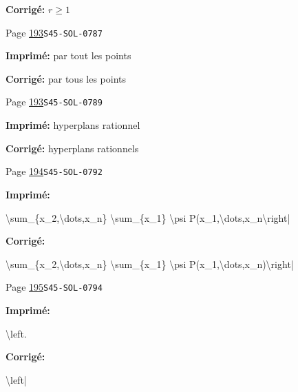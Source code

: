 \begin{description}
\par\noindent\textbf{Corrigé:} $r\geqslant 1$
\smallskip
\item[\hypertarget{apparatus:FR-0169}{169}] Page \hyperlink{printpage:fr:193}{193}\quad\texttt{S45-SOL-0787}
\par\noindent\textbf{Imprimé:} par tout les points
\par\noindent\textbf{Corrigé:} par tous les points
\smallskip
\item[\hypertarget{apparatus:FR-0170}{170}] Page \hyperlink{printpage:fr:193}{193}\quad\texttt{S45-SOL-0789}
\par\noindent\textbf{Imprimé:} hyperplans rationnel
\par\noindent\textbf{Corrigé:} hyperplans rationnels
\smallskip
\item[\hypertarget{apparatus:FR-0171}{171}] Page \hyperlink{printpage:fr:194}{194}\quad\texttt{S45-SOL-0792}
\par\noindent\textbf{Imprimé:} {\footnotesize\ttfamily\raggedright \textbackslash{}\allowbreak{}sum\_\allowbreak{}\{\allowbreak{}x\_\allowbreak{}2,\allowbreak{}\textbackslash{}\allowbreak{}dots,\allowbreak{}x\_\allowbreak{}n\}\allowbreak{} \textbackslash{}\allowbreak{}sum\_\allowbreak{}\{\allowbreak{}x\_\allowbreak{}1\}\allowbreak{} \textbackslash{}\allowbreak{}psi P(\allowbreak{}x\_\allowbreak{}1,\allowbreak{}\textbackslash{}\allowbreak{}dots,\allowbreak{}x\_\allowbreak{}n\textbackslash{}\allowbreak{}right|\par}
\par\noindent\textbf{Corrigé:} {\footnotesize\ttfamily\raggedright \textbackslash{}\allowbreak{}sum\_\allowbreak{}\{\allowbreak{}x\_\allowbreak{}2,\allowbreak{}\textbackslash{}\allowbreak{}dots,\allowbreak{}x\_\allowbreak{}n\}\allowbreak{} \textbackslash{}\allowbreak{}sum\_\allowbreak{}\{\allowbreak{}x\_\allowbreak{}1\}\allowbreak{} \textbackslash{}\allowbreak{}psi P(\allowbreak{}x\_\allowbreak{}1,\allowbreak{}\textbackslash{}\allowbreak{}dots,\allowbreak{}x\_\allowbreak{}n)\allowbreak{}\textbackslash{}\allowbreak{}right|\par}
\smallskip
\item[\hypertarget{apparatus:FR-0172}{172}] Page \hyperlink{printpage:fr:195}{195}\quad\texttt{S45-SOL-0794}
\par\noindent\textbf{Imprimé:} {\footnotesize\ttfamily\raggedright \textbackslash{}\allowbreak{}left.\par}
\par\noindent\textbf{Corrigé:} {\footnotesize\ttfamily\raggedright \textbackslash{}\allowbreak{}left|\par}

\end{description}

